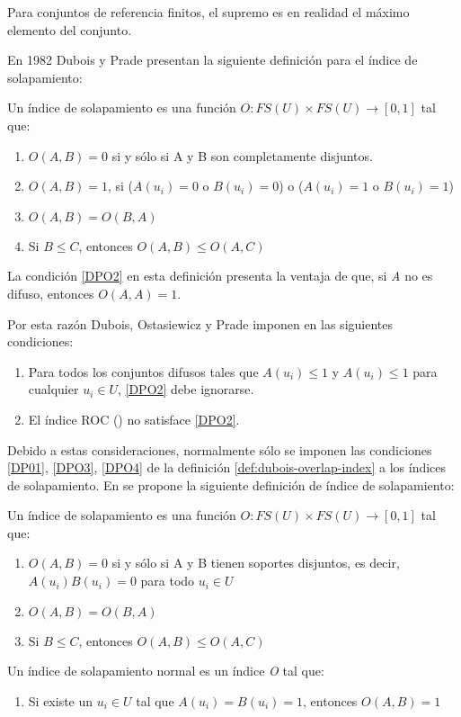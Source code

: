 Para conjuntos de referencia finitos, el supremo es en realidad el máximo elemento del conjunto.

En 1982 Dubois y Prade \cite{dubois2000} presentan la siguiente definición para el índice de solapamiento:

\begin{definition}
Un índice de solapamiento es una función $O : FS(U) \times FS(U) \rightarrow [0,1]$ tal que:
\begin{enumerate}[label=(O\arabic*),ref=(O\arabic*)]
\item $O(A,B) = 0$ si y sólo si A y B son completamente disjuntos. \label{DP01}
\item $O(A,B) = 1$, si ($A(u_{i}) = 0$ o $B(u_{i}) = 0$) o ($A(u_{i}) = 1$ o $B(u_{i}) = 1$) \label{DPO2}
\item $O(A,B) = O(B,A)$ \label{DPO3}
\item Si $B \leq C$, entonces $O(A,B) \leq O(A,C)$ \label{DPO4}
\end{enumerate}
\label{def:dubois-overlap-index}
\end{definition}
La condición \ref{DPO2} en esta definición presenta la ventaja de que, si \emph{A} no es difuso, entonces $O(A,A) = 1$.

Por esta razón Dubois, Ostasiewicz y Prade imponen en \cite{dubois2000} las siguientes condiciones:
\begin{enumerate}[label=(\arabic*),ref=(\arabic*)]
\item Para todos los conjuntos difusos tales que $A(u_{i}) \le 1$ y $A(u_{i}) \le 1$ para cualquier $u_{i} \in U$, \ref{DPO2} debe ignorarse.
\item El índice ROC (\cite{dubois2000}) no satisface \ref{DPO2}.
\end{enumerate}
Debido a estas consideraciones, normalmente sólo se imponen las condiciones \ref{DP01}, \ref{DPO3}, \ref{DPO4} de la definición \ref{def:dubois-overlap-index} a los índices de solapamiento.
En \cite{bustince2013overlap} se propone la siguiente definición de índice de solapamiento:
\begin{definition}\label{def:bustince-overlap-index}
Un índice de solapamiento es una función $O : FS(U) \times FS(U) \rightarrow [0,1]$ tal que:
\begin{enumerate}[label=(O\arabic*),ref=(O\arabic*)]
\item $O(A,B) = 0$ si y sólo si A y B tienen soportes disjuntos, es decir, $A(u_{i})B(u_{i}) = 0$ para todo $u_{i} \in U$\label{BO1}
\item $O(A,B) = O(B,A)$\label{BO2}
\item Si $B \leq C$, entonces $O(A,B) \leq O(A,C)$\label{BO3}
\end{enumerate}
Un índice de solapamiento normal es un índice \emph{O} tal que:
\begin{enumerate}[label=(O4),ref=(O4)]
\item Si existe un $u_{i} \in U$ tal que $A(u_{i}) = B(u_{i}) = 1$, entonces $O(A,B) = 1$\label{BO4}
\end{enumerate}
\end{definition}
